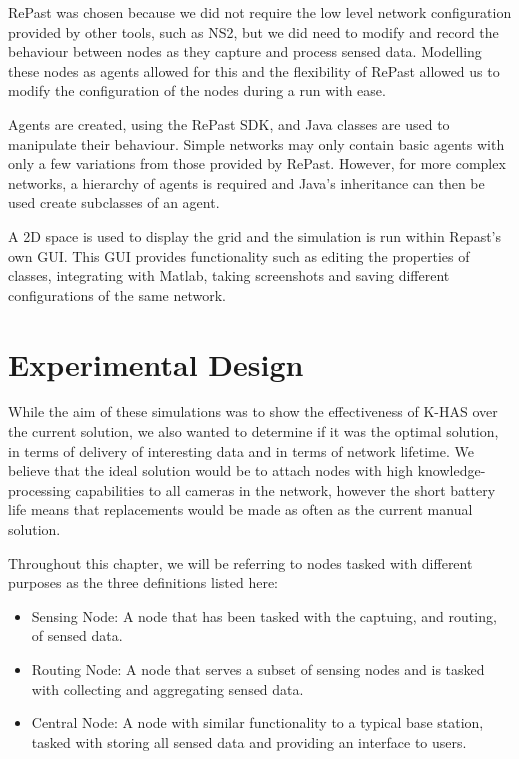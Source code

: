 RePast was chosen because we did not require the low level network configuration provided by other tools, such as NS2, but we did need to modify and record the behaviour between nodes as they capture and process sensed data. Modelling these nodes as agents allowed for this and the flexibility of RePast allowed us to modify the configuration of the nodes during a run with ease.

Agents are created, using the RePast SDK, and Java classes are used to manipulate their behaviour. Simple networks may only contain basic agents with only a few variations from those provided by RePast. However, for more complex networks, a hierarchy of agents is required and Java's inheritance can then be used create subclasses of an agent.

A 2D space is used to display the grid and the simulation is run within Repast's own GUI. This GUI provides functionality such as editing the properties of classes, integrating with Matlab, taking screenshots and saving different configurations of the same network.

\section{Experimental Design}\label{sim:imp}
	While the aim of these simulations was to show the effectiveness of K-HAS over the current solution, we also wanted to determine if it was the optimal solution, in terms of delivery of interesting data and in terms of network lifetime. We believe that the ideal solution would be to attach nodes with high knowledge-processing capabilities to all cameras in the network, however the short battery life means that replacements would be made as often as the current manual solution. 

	Throughout this chapter, we will be referring to nodes tasked with different purposes as the three definitions listed here:
	\begin{itemize}
		\item Sensing Node: A node that has been tasked with the captuing, and routing, of sensed data.
		\item Routing Node: A node that serves a subset of sensing nodes and is tasked with collecting and aggregating sensed data.
		\item Central Node: A node with similar functionality to a typical base station, tasked with storing all sensed data and providing an interface to users.
	\end{itemize}

